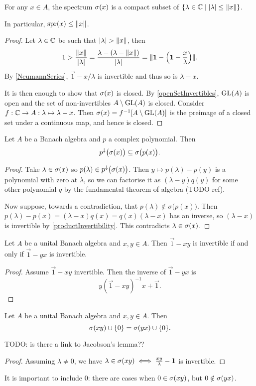 \begin{proposition} \label{spectrumCompact}
For any $x\in A$, the spectrum $\sigma(x)$ is a compact subset of $\setbuilder{\lambda\in\C}{|\lambda|\leq \norm{x}}$.

In particular, $\operatorname{spr}(x) \leq \lVert x\rVert$.
\end{proposition}
\begin{proof}
Let $\lambda\in \mathbb{C}$ be such that $|\lambda|>\norm{x}$, then
\[ 1 > \frac{\lVert x\rVert}{|\lambda|} = \frac{\lambda - (\lambda - \lVert x\rVert)}{|\lambda|} = \lVert\boldsymbol{\mathrm{1}} - \left(\boldsymbol{\mathrm{1}} - \frac{x}{\lambda}\right)\rVert. \]
By \ref{NeumannSeries}, $\vec{1} - x/\lambda$ is invertible and thus so is $\lambda-x$.

It is then enough to show that $\sigma(x)$ is closed. By \ref{openSetInvertibles}, $\operatorname{GL}(A)$ is open and the set of non-invertibles $A\setminus \operatorname{GL}(A)$ is closed. Consider $f: \mathbb{C} \to A: \lambda \mapsto \lambda - x$. Then $\sigma(x) = f^{-1}[A\setminus \operatorname{GL}(A)]$ is the preimage of a closed set under a continuous map, and hence is closed.
\end{proof}

\begin{lemma} \label{polynomialSpectralMapping}
Let $A$ be a Banach algebra and $p$ a complex polynomial. Then
\[ p^{\downarrow}\big(\sigma(x)\big) \subseteq \sigma\big(p(x)\big). \]
\end{lemma}
\begin{proof}
Take $\lambda\in\sigma(x)$ so $p(\lambda)\in p^{\downarrow}\big(\sigma(x)\big)$. Then $y\mapsto p(\lambda)-p(y)$ is a polynomial with zero at $\lambda$, so we can factorise it as $(\lambda - y)q(y)$ for some other polynomial $q$ by the fundamental theorem of algebra (TODO ref).

Now suppose, towards a contradiction, that $p(\lambda)\notin \sigma\big(p(x)\big)$. Then $p(\lambda) - p(x) = (\lambda - x)q(x) = q(x)(\lambda - x)$ has an inverse, so $(\lambda - x)$ is invertible by \ref{productInvertibility}. This contradicts $\lambda\in\sigma(x)$.
\end{proof}

\begin{proposition}
Let $A$ be a unital Banach algebra and $x,y\in A$. Then $\vec{1} - xy$ is invertible \textup{if and only if} $\vec{1} - yx$ is invertible.
\end{proposition}
\begin{proof}
Assume $\vec{1} - xy$ invertible. Then the inverse of $\vec{1} - yx$ is
\[ y(\vec{1} - xy)^{-1}x + \vec{1}. \]
\end{proof}
\begin{corollary} \label{spectrumSwappedElements}
Let $A$ be a unital Banach algebra and $x,y\in A$. Then
\[ \sigma(xy)\cup\{0\} = \sigma(yx)\cup\{0\}. \]
\end{corollary}
TODO: is there a link to Jacobson's lemma??
\begin{proof}
Assuming $\lambda \neq 0$, we have $\lambda\in\sigma(xy) \iff \frac{xy}{\lambda} - \boldsymbol{\mathrm{1}}$ is invertible.
\end{proof}
It is important to include $0$: there are cases when $0\in \sigma(xy)$, but $0\notin \sigma(yx)$.

